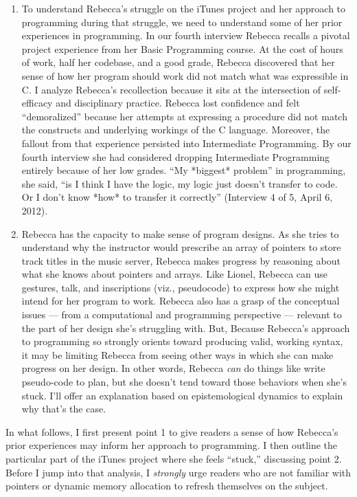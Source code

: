 \begin{enumerate}
\def\labelenumi{\arabic{enumi}.}
\item
  To understand Rebecca's struggle on the iTunes project and her
  approach to programming during that struggle, we need to understand
  some of her prior experiences in programming. In our fourth interview
  Rebecca recalls a pivotal project experience from her Basic
  Programming course. At the cost of hours of work, half her codebase,
  and a good grade, Rebecca discovered that her sense of how her program
  should work did not match what was expressible in C. I analyze
  Rebecca's recollection because it sits at the intersection of
  self-efficacy and disciplinary practice. Rebecca lost confidence and
  felt ``demoralized'' because her attempts at expressing a procedure
  did not match the constructs and underlying workings of the C
  language. Moreover, the fallout from that experience persisted into
  Intermediate Programming. By our fourth interview she had considered
  dropping Intermediate Programming entirely because of her low grades.
  ``My *biggest* problem'' in programming, she said, ``is I think I have
  the logic, my logic just doesn't transfer to code. Or I don't know
  *how* to transfer it correctly'' (Interview 4 of 5, April 6, 2012).
\item
  Rebecca has the capacity to make sense of program designs. As she
  tries to understand why the instructor would prescribe an array of
  pointers to store track titles in the music server, Rebecca makes
  progress by reasoning about what she knows about pointers and arrays.
  Like Lionel, Rebecca can use gestures, talk, and inscriptions (viz.,
  pseudocode) to express how she might intend for her program to work.
  Rebecca also has a grasp of the conceptual issues --- from a
  computational and programming perspective --- relevant to the part of
  her design she's struggling with. But, Because Rebecca's approach to
  programming so strongly orients toward producing valid, working
  syntax, it may be limiting Rebecca from seeing other ways in which she
  can make progress on her design. In other words, Rebecca \emph{can} do
  things like write pseudo-code to plan, but she doesn't tend toward
  those behaviors when she's stuck. I'll offer an explanation based on
  epistemological dynamics to explain why that's the case.
\end{enumerate}

In what follows, I first present point 1 to give readers a sense of how
Rebecca's prior experiences may inform her approach to programming. I
then outline the particular part of the iTunes project where she feels
``stuck,'' discussing point 2. Before I jump into that analysis, I
\emph{strongly} urge readers who are not familiar with pointers or
dynamic memory allocation to refresh themselves on the subject.

